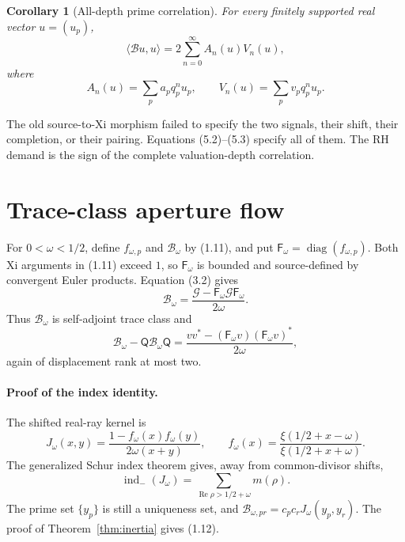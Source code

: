 \documentclass[11pt]{article}
\newtheorem{corollary}[theorem]{Corollary}
\theoremstyle{definition}
\theoremstyle{remark}
\newcommand{\cB}{\mathcal B}
\newcommand{\cG}{\mathcal G}
\newcommand{\diag}{\operatorname{diag}}
\newcommand{\indm}{\operatorname{ind}_{-}}
\newcommand{\Rea}{\operatorname{Re}}
\newcommand{\ip}[2]{\langle #1,#2\rangle}
\begin{document}
\begin{corollary}[All-depth prime correlation]
\label{cor:depth}
For every finitely supported real vector $u=(u_p)$,
\begin{equation}
 \ip{\cB u}{u}
 =2\sum_{n=0}^{\infty}A_n(u)V_n(u),                        \tag{5.2}
\end{equation}
where
\begin{equation}
 A_n(u)=\sum_p a_pq_p^nu_p,\qquad
 V_n(u)=\sum_p v_pq_p^nu_p.                                \tag{5.3}
\end{equation}
\end{corollary}

The old source-to-Xi morphism failed to specify the two signals, their shift, their completion,
or their pairing.  Equations (5.2)--(5.3) specify all of them.  The RH demand is the sign of the
complete valuation-depth correlation.

\section{Trace-class aperture flow}
\label{sec:flow}

For $0<\omega<1/2$, define $f_{\omega,p}$ and $\cB_\omega$ by (1.11), and put
$\mathsf F_\omega=\diag(f_{\omega,p})$.  Both Xi arguments in (1.11) exceed $1$, so
$\mathsf F_\omega$ is bounded and source-defined by convergent Euler products.  Equation (3.2)
gives
\begin{equation}
 \cB_\omega
 =\frac{\cG-\mathsf F_\omega\cG\mathsf F_\omega}{2\omega}.
                                                               \tag{6.1}
\end{equation}
Thus $\cB_\omega$ is self-adjoint trace class and
\begin{equation}
 \cB_\omega-\mathsf Q\cB_\omega\mathsf Q
 =\frac{vv^*-(\mathsf F_\omega v)(\mathsf F_\omega v)^*}
        {2\omega},                                         \tag{6.2}
\end{equation}
again of displacement rank at most two.

\paragraph{Proof of the index identity.}
The shifted real-ray kernel is
\begin{equation}
 J_\omega(x,y)
 =\frac{1-f_\omega(x)f_\omega(y)}{2\omega(x+y)},\qquad
 f_\omega(x)=\frac{\xi(1/2+x-\omega)}
                   {\xi(1/2+x+\omega)}.                    \tag{6.3}
\end{equation}
The generalized Schur index theorem gives, away from common-divisor shifts,
\[
 \indm(J_\omega)
 =\sum_{\Rea\rho>1/2+\omega}m(\rho).
\]
The prime set $\{y_p\}$ is still a uniqueness set, and
$\cB_{\omega,pr}=c_pc_rJ_\omega(y_p,y_r)$.  The proof of
Theorem~\ref{thm:inertia} gives (1.12).
\end{document}
